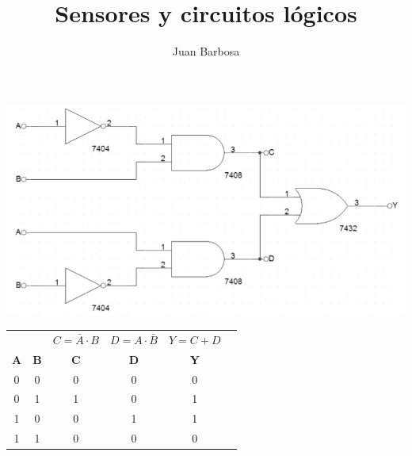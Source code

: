 \documentclass[]{article}
\title{Sensores y circuitos l\'ogicos}
\author{Juan Barbosa}
\begin{document}
\maketitle

\begin{center}
	\includegraphics[scale = 0.3]{Circuit.png}
\end{center}

\begin{table}[h]
	\centering
	\begin{tabular}{cc||cccc}
		\hline
		 & & $C = \bar{A} \cdot B$ & $D = A \cdot \bar{B}$ & $Y = C + D$ \\
		\textbf{A} & \textbf{B} & \textbf{C} & \textbf{D} & \textbf{Y} \\
		\hline
		0 & 0 & 0 & 0 & 0 \\
		0 & 1 & 1 & 0 & 1 \\
		1 & 0 & 0 & 1 & 1 \\
		1 & 1 & 0 & 0 & 0 \\
		\hline
	\end{tabular}
\end{table}
\end{document}
